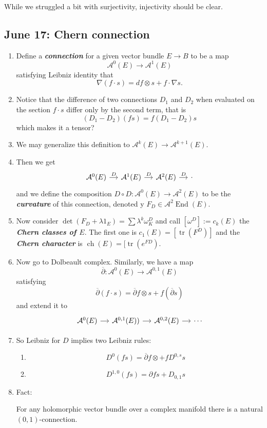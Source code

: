 \begin{remark}
	While we struggled a bit with surjectivity, injectivity should be clear.
\end{remark}

\subsection{June 17: Chern connection}\label{sec:June 17: Chern connection}

\begin{enumerate}
	\item Define a \textit{\textbf{connection}} for a given vector bundle $E\to B$ to be a map
		\[\mathcal{A}^0(E)\to\mathcal{A}^1(E)\]
satisfying Leibniz identity that
\[\nabla (f\cdot s)=df\otimes s+f\cdot\nabla s.\]
\item Notice that the difference of two connections $D_1$ and $D_2$ when evaluated on the section $f\cdot s$ differ only by the second term, that is
	 \[(D_1-D_2)(fs)=f(D_1-D_2)s\]
	 which makes it a {\color{magenta}tensor?}
 \item We may generalize this definition to $\mathcal{A}^k(E)\to \mathcal{A}^{k+1}(E)$.
 \item Then we get
	 \[\begin{tikzcd}[column sep=small]
		 \mathcal{A}^{0}(E)\arrow[r,"D"]&\mathcal{A}^{1}(E)\arrow[r,"D"]&\mathcal{A}^2(E)\arrow[r,"D"]&\cdot
	 \end{tikzcd}\]
	 and we define the composition $D\circ D:\mathcal{A}^0(E)\to \mathcal{A}^2(E)$ to be the \textit{\textbf{curvature}}  of this connection, denoted y $F_D\in \mathcal{A}^2\operatorname{End}(E)$.
 \item Now consider $\det(F_D+\lambda1_E)=\sum \lambda^k\omega_K^D$ and call $[\omega^D]:=c_k(E)$ the \textit{\textbf{Chern classes of $E$}}. The first one is $c_1(E)=[\operatorname{tr}(F^D)]$ and the \textit{\textbf{Chern character}} is $\operatorname{ch}(E)=[\operatorname{tr}(e^{FD})$.
 \item Now go to Dolbeault complex. Similarly, we have a map
	 \[\overline{\partial}:\mathcal{A}^0(E)\to\mathcal{A}^{0,1}(E)\]
	 satisfying
	 \[\overline{\partial}(f\cdot s)=\overline{\partial}f\otimes s+f(\overline{\partial}s)\]
	 and extend it to
	 \[\begin{tikzcd}[column sep=small]
		 \mathcal{A}^{0}(E)\arrow[r]&\mathcal{A}^{0,1}(E))\arrow[r]&\mathcal{A}^{0,2}(E)\arrow[r]&\cdots
	 \end{tikzcd}\]
 \item So Leibniz for $D$ implies two Leibniz rules:
	  \begin{enumerate}
	 	\item \[D^0(fs)=\overline{\partial}f\otimes +fD^{0,s}s\]
		\item \[D^{1,0}(fs)=\partial fs+D_{0,1}s\]
	 \end{enumerate}
 \item Fact:
	 \begin{thm}
	 	For any holomorphic vector bundle over a complex manifold there is a natural $(0,1)$-connection.
	 \end{thm}
	 \begin{defn}
	 	

\end{defn}
\end{enumerate}
